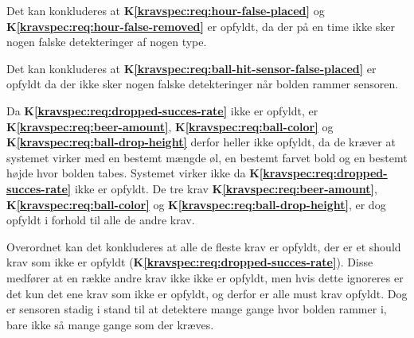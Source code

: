 \documentclass[Modultest/Modultest_main.tex]{subfiles}
\begin{document}
Det kan konkluderes at \textbf{K\ref{kravspec:req:hour-false-placed}} og \textbf{K\ref{kravspec:req:hour-false-removed}} er opfyldt, da der på en time ikke sker nogen falske detekteringer af nogen type.

Det kan konkluderes at \textbf{K\ref{kravspec:req:ball-hit-sensor-false-placed}} er opfyldt da der ikke sker nogen falske detekteringer når bolden rammer sensoren.

Da  \textbf{K\ref{kravspec:req:dropped-succes-rate}} ikke er opfyldt, er \textbf{K\ref{kravspec:req:beer-amount}}, \textbf{K\ref{kravspec:req:ball-color}} og  \textbf{K\ref{kravspec:req:ball-drop-height}} derfor heller ikke opfyldt, da de kræver at systemet virker med en bestemt mængde øl, en bestemt farvet bold og en bestemt højde hvor bolden tabes. Systemet virker ikke da \textbf{K\ref{kravspec:req:dropped-succes-rate}} ikke er opfyldt. De tre krav \textbf{K\ref{kravspec:req:beer-amount}}, \textbf{K\ref{kravspec:req:ball-color}} og  \textbf{K\ref{kravspec:req:ball-drop-height}}, er dog opfyldt i forhold til alle de andre krav.

Overordnet kan det konkluderes at alle de fleste krav er opfyldt, der er et should krav som ikke er opfyldt (\textbf{K\ref{kravspec:req:dropped-succes-rate}}). Disse medfører at en række andre krav ikke ikke er opfyldt, men hvis dette ignoreres er det kun det ene krav som ikke er opfyldt, og derfor er alle must krav opfyldt. Dog er sensoren stadig i stand til at detektere mange gange hvor bolden rammer i, bare ikke så mange gange som der kræves. 
\end{document}
